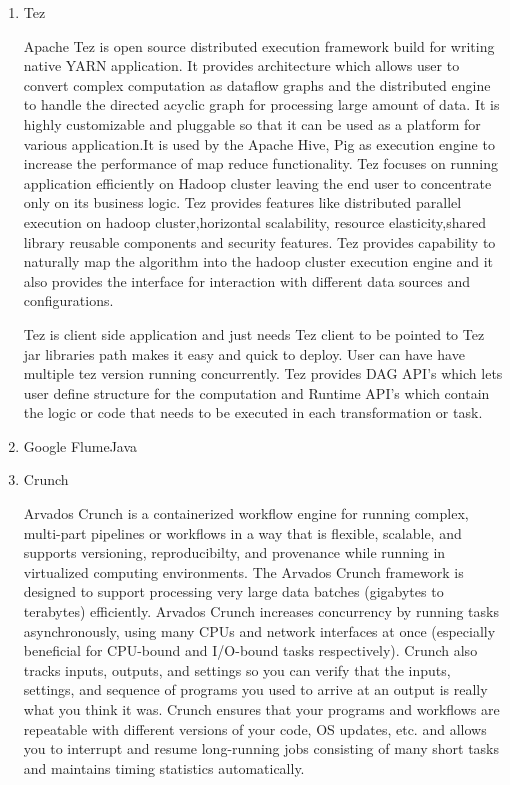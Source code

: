 \begin{enumerate}
\item {} 
Tez

Apache Tez is open source distributed execution framework build
for writing native YARN application. It provides architecture
which allows user to convert complex computation as dataflow
graphs and the distributed engine to handle the directed acyclic
graph for processing large amount of data. It is highly
customizable and pluggable so that it can be used as a platform
for various application.It is used by the Apache Hive, Pig as
execution engine to increase the performance of map reduce
functionality.  \label{\detokenize{i524/technologies:id39}}{\hyperref[\detokenize{i524/technologies:www-apache-tez}]{\sphinxcrossref{{[}34{]}}}} Tez focuses on running
application efficiently on Hadoop cluster leaving the end user to
concentrate only on its business logic. Tez provides features like
distributed parallel execution on hadoop cluster,horizontal
scalability, resource elasticity,shared library reusable
components and security features. Tez provides capability to
naturally map the algorithm into the hadoop cluster execution
engine and it also provides the interface for interaction with
different data sources and configurations.

Tez is client side application and just needs Tez client to be
pointed to Tez jar libraries path makes it easy and quick to
deploy. User can have have multiple tez version running
concurrently. Tez provides DAG API's which lets user define
structure for the computation and Runtime API's which contain the
logic or code that needs to be executed in each transformation or
task.

\item {} 
Google FlumeJava

\item {} 
Crunch

Arvados Crunch \label{\detokenize{i524/technologies:id40}}{\hyperref[\detokenize{i524/technologies:www-arvados}]{\sphinxcrossref{{[}35{]}}}} is a containerized workflow
engine for running complex, multi-part pipelines or workflows in a
way that is flexible, scalable, and supports versioning,
reproducibilty, and provenance while running in virtualized
computing environments. The Arvados Crunch \label{\detokenize{i524/technologies:id41}}{\hyperref[\detokenize{i524/technologies:www-crunch}]{\sphinxcrossref{{[}36{]}}}}
framework is designed to support processing very large data
batches (gigabytes to terabytes) efficiently. Arvados Crunch
increases concurrency by running tasks asynchronously, using many
CPUs and network interfaces at once (especially beneficial for
CPU-bound and I/O-bound tasks respectively). Crunch also tracks
inputs, outputs, and settings so you can verify that the inputs,
settings, and sequence of programs you used to arrive at an output
is really what you think it was. Crunch ensures that your programs
and workflows are repeatable with different versions of your code,
OS updates, etc. and allows you to interrupt and resume
long-running jobs consisting of many short tasks and maintains
timing statistics automatically.


\end{enumerate}
